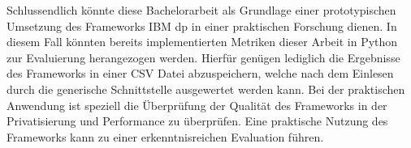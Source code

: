Schlussendlich könnte diese Bachelorarbeit als Grundlage einer prototypischen Umsetzung des Frameworks IBM \gls{dp} in einer praktischen Forschung dienen. In diesem Fall könnten bereits implementierten Metriken dieser Arbeit in Python zur Evaluierung herangezogen werden. Hierfür genügen lediglich die Ergebnisse des Frameworks in einer CSV Datei abzuspeichern, welche nach dem Einlesen durch die generische Schnittstelle ausgewertet werden kann. Bei der praktischen Anwendung ist speziell die Überprüfung der Qualität des Frameworks in der Privatisierung und Performance zu überprüfen. Eine praktische Nutzung des Frameworks kann zu einer erkenntnisreichen Evaluation führen.